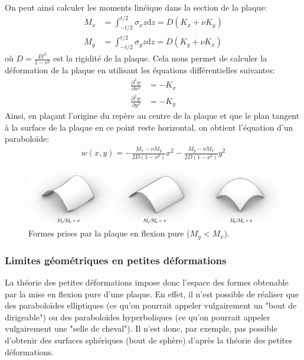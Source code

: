 \documentclass[11pt,titlepage]{article}
\begin{document}
On peut ainsi calculer les moments linéique dans la section de la plaque:
\begin{align}
    M_x &= \int_{-t/2}^{t/2} \sigma_x z \mathrm{d}z = D \left (K_x + \nu K_y\right )\\
    M_y &= \int_{-t/2}^{t/2} \sigma_y z \mathrm{d}z = D \left (K_y + \nu K_x\right )
\end{align}
où $D = \frac{Et^3}{1-\nu^2}$ est la rigidité de la plaque. Cela nous permet de calculer la déformation de la plaque en utilisant les équations différentielles suivantes:
\begin{align}
\frac{\partial^2w}{\partial x^2} &= -K_x \\
\frac{\partial^2w}{\partial y^2} &= -K_y
\end{align}
Ainsi, en plaçant l'origine du repère au centre de la plaque et que le plan tangent à la surface de la plaque en ce point reste horizontal, on obtient l'équation d'un paraboloïde:
\begin{align}
w(x,y)  = -\frac{M_x - \nu M_y}{2D(1-\nu^2)} x^2 - \frac{M_y - \nu M_x}{2D(1-\nu^2)} y^2
\end{align}

\begin{figure}[H]
    \centering
    \includegraphics[width=\textwidth]{img/cintrage_froid/shapes.pdf}
    \caption{Formes prises par la plaque en flexion pure ($M_y < M_x$).}
    \label{fig:petite_def}
\end{figure}

\subsubsection{Limites géométriques en petites déformations}

La théorie des petites déformations impose donc l'espace des formes obtenable par la mise en flexion pure d'une plaque. En effet, il n'est possible de réaliser que des paraboloïdes elliptiques (ce qu'on pourrait appeler vulgairement un "bout de dirigeable") ou des paraboloïdes hyperboliques (ce qu'on pourrait appeler vulgairement une "selle de cheval"). Il n'est donc, par exemple, pas possible d'obtenir des surfaces sphériques (bout de sphère) d'après la théorie des petites déformations.
\\
\end{document}
